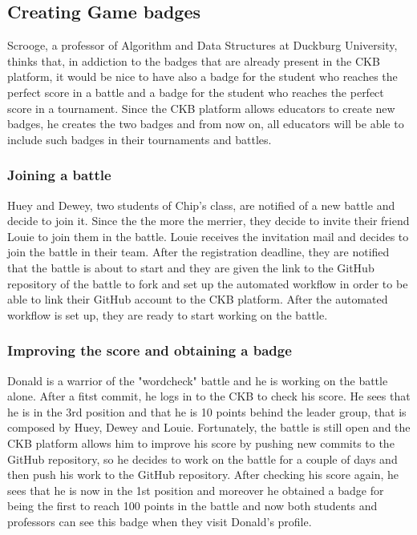 \subsection{Creating Game badges}
Scrooge, a professor of Algorithm and Data Structures at Duckburg University, thinks that, in addiction to the badges that are already present in the CKB platform, it would be nice to have also a badge for the student who reaches the perfect score in a battle and a badge for the student who reaches the perfect score in a tournament.
Since the CKB platform allows educators to create new badges, he creates the two badges and from now on, all educators will be able to include such badges in their tournaments and battles.

\subsubsection{Joining a battle}
Huey and Dewey, two students of Chip's class, are notified of a new battle and decide to join it.
Since the the more the merrier, they decide to invite their friend Louie to join them in the battle.
Louie receives the invitation mail and decides to join the battle in their team.
After the registration deadline, they are notified that the battle is about to start and they are given the link to the GitHub repository of the battle to fork and set up the automated workflow in order to be able to link their GitHub account to the CKB platform.
After the automated workflow is set up, they are ready to start working on the battle.

\subsubsection{Improving the score and obtaining a badge}
Donald is a warrior of the "wordcheck" battle and he is working on the battle alone.
After a fitst commit, he logs in to the CKB to check his score.
He sees that he is in the 3rd position and that he is 10 points behind the leader group, that is composed by Huey, Dewey and Louie.
Fortunately, the battle is still open and the CKB platform allows him to improve his score by pushing new commits to the GitHub repository, so he decides to work on the battle for a couple of days and then push his work to the GitHub repository.
After checking his score again, he sees that he is now in the 1st position and moreover he obtained a badge for being the first to reach 100 points in the battle and now both students and professors can see this badge when they visit Donald's profile.

